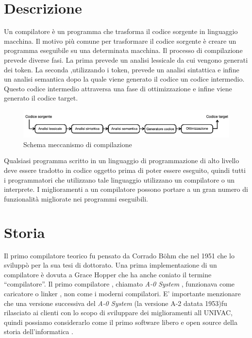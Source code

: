 \documentclass[12pt,a4paper]{report}
\begin{document}
\section{Descrizione}
Un compilatore è un programma che trasforma il codice sorgente in linguaggio macchina. Il motivo più comune per trasformare il codice sorgente è creare un programma eseguibile su una determinata macchina. Il processo di compilazione prevede diverse fasi. La prima prevede un analisi lessicale da cui vengono generati dei token. La seconda ,utilizzando i token, prevede un analisi sintattica e infine un analisi semantica dopo la quale viene generato il codice un codice intermedio. Questo codice intermedio attraversa una fase di ottimizzazione e infine viene generato il codice target.


\begin{figure}
\centering
\includegraphics[width = \textwidth]{SchemaCompilatore.png}
\caption{Schema meccanismo di compilazione}
\label{Fig:MeccanismoCompilazione}
\end{figure} %

Qualsiasi programma scritto in un linguaggio di programmazione di alto livello deve essere tradotto in codice oggetto prima di poter essere eseguito, quindi tutti i programmatori che utilizzano tale linguaggio utilizzano un compilatore o un interprete. I miglioramenti a un compilatore possono portare a un gran numero di funzionalità migliorate nei programmi eseguibili.

\section{Storia}
Il primo compilatore teorico fu pensato da Corrado Böhm che nel 1951 che lo sviluppò per la sua tesi di dottorato.  Una  prima implementazione di un compilatore è dovuta a Grace Hopper  che ha anche coniato il termine ``compilatore''.  Il primo compilatore , chiamato \textit{A-0 System} ,  funzionava come caricatore o linker , non come i moderni compilatori. E' importante menzionare che una versione successiva del \textit{A-0 System} (la versione A-2 datata 1953)fu rilasciato ai clienti con lo scopo di sviluppare dei miglioramenti all UNIVAC, quindi possiamo considerarlo come il primo software libero e open source della storia dell'informatica \cite{SystemA0}.
\end{document}
